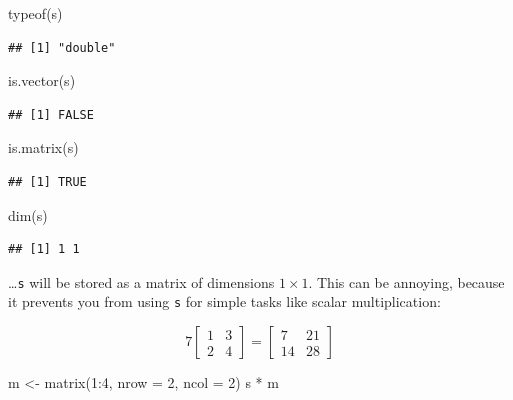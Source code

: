 \documentclass[
  11pt,
]{article}
\newenvironment{Shaded}{\begin{snugshade}}{\end{snugshade}}
\newcommand{\AttributeTok}[1]{\textcolor[rgb]{0.77,0.63,0.00}{#1}}
\newcommand{\DecValTok}[1]{\textcolor[rgb]{0.00,0.00,0.81}{#1}}
\newcommand{\FunctionTok}[1]{\textcolor[rgb]{0.00,0.00,0.00}{#1}}
\newcommand{\NormalTok}[1]{#1}
\newcommand{\OtherTok}[1]{\textcolor[rgb]{0.56,0.35,0.01}{#1}}
\newcommand{\SpecialCharTok}[1]{\textcolor[rgb]{0.00,0.00,0.00}{#1}}
\begin{document}
\begin{Shaded}
\begin{Highlighting}[]
\FunctionTok{typeof}\NormalTok{(s)}
\end{Highlighting}
\end{Shaded}

\begin{verbatim}
## [1] "double"
\end{verbatim}

\begin{Shaded}
\begin{Highlighting}[]
\FunctionTok{is.vector}\NormalTok{(s)}
\end{Highlighting}
\end{Shaded}

\begin{verbatim}
## [1] FALSE
\end{verbatim}

\begin{Shaded}
\begin{Highlighting}[]
\FunctionTok{is.matrix}\NormalTok{(s)}
\end{Highlighting}
\end{Shaded}

\begin{verbatim}
## [1] TRUE
\end{verbatim}

\begin{Shaded}
\begin{Highlighting}[]
\FunctionTok{dim}\NormalTok{(s)}
\end{Highlighting}
\end{Shaded}

\begin{verbatim}
## [1] 1 1
\end{verbatim}

\ldots{}\texttt{s} will be stored as a matrix of dimensions \(1 \times 1\). This can be annoying, because it prevents you from using \texttt{s} for simple tasks like scalar multiplication:

\[ 7 \begin{bmatrix} 1 & 3 \\ 2 & 4\end{bmatrix} = \begin{bmatrix} 7 & 21 \\ 14 & 28\end{bmatrix}\]

\begin{Shaded}
\begin{Highlighting}[]
\NormalTok{m }\OtherTok{\textless{}{-}} \FunctionTok{matrix}\NormalTok{(}\DecValTok{1}\SpecialCharTok{:}\DecValTok{4}\NormalTok{, }\AttributeTok{nrow =} \DecValTok{2}\NormalTok{, }\AttributeTok{ncol =} \DecValTok{2}\NormalTok{)}
\NormalTok{s }\SpecialCharTok{*}\NormalTok{ m}
\end{Highlighting}
\end{Shaded}
\end{document}

